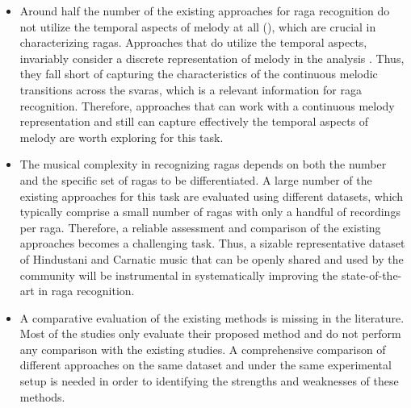 \begin{itemize}
	\item Around half the number of the existing approaches for \gls{raga} recognition do not utilize the temporal aspects of melody at all (), which are crucial in characterizing \glspl{raga}. Approaches that do utilize the temporal aspects, invariably consider a discrete representation of melody in the analysis . Thus, they fall short of capturing the characteristics of the continuous melodic transitions across the \glspl{svara}, which is a relevant information for \gls{raga} recognition. Therefore, approaches that can work with a continuous melody representation and still can capture effectively the temporal aspects of melody are worth exploring for this task.
	
	\item The musical complexity in recognizing \glspl{raga} depends on both the number and the specific set of \glspl{raga} to be differentiated. A large number of the existing approaches for this task are evaluated using different datasets, which typically comprise a small number of \glspl{raga} with only a handful of recordings per \gls{raga}. Therefore, a reliable assessment and comparison of the existing approaches becomes a challenging task. Thus, a sizable representative dataset of Hindustani and Carnatic music that can be openly shared and used by the community will be instrumental in systematically improving the state-of-the-art in \gls{raga} recognition.
	
	\item A comparative  evaluation of the existing methods is missing in the literature. Most of the studies only evaluate their proposed method and do not perform any comparison with the existing studies. A comprehensive comparison of different approaches on the same dataset and under the same experimental setup is needed in order to identifying the strengths and weaknesses of these methods.
	
\end{itemize}


